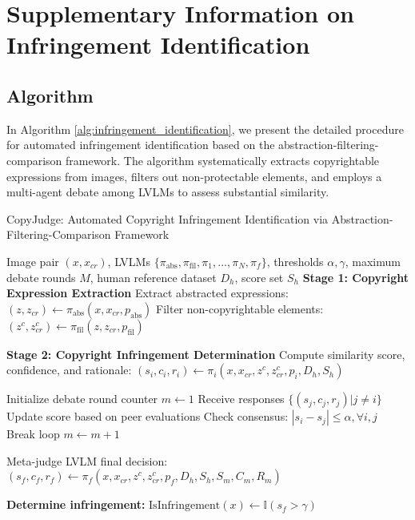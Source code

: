 \section{Supplementary Information on Infringement Identification}

\subsection{Algorithm}
\label{algA}
In Algorithm \ref{alg:infringement_identification}, we present the detailed procedure for automated infringement identification based on the abstraction-filtering-comparison framework. The algorithm systematically extracts copyrightable expressions from images, filters out non-protectable elements, and employs a multi-agent debate among LVLMs to assess substantial similarity.  

\begin{algorithm}
\caption{CopyJudge: Automated Copyright Infringement Identification via Abstraction-Filtering-Comparison Framework}
\label{alg:infringement_identification}
\begin{algorithmic}[1]
\REQUIRE Image pair $(x, x_{cr})$, LVLMs $\{\pi_\text{abs}, \pi_\text{fil}, \pi_1, \dots, \pi_N, \pi_f\}$, thresholds $\alpha, \gamma$, maximum debate rounds $M$, human reference dataset $D_h$, score set $S_h$
\STATE \textbf{Stage 1: Copyright Expression Extraction}
\STATE Extract abstracted expressions: \newline
    \quad $(z, z_{cr}) \leftarrow \pi_\text{abs}(x, x_{cr}, p_\text{abs})$
\STATE Filter non-copyrightable elements: \newline
    \quad $(z^c, z^c_{cr}) \leftarrow \pi_\text{fil}(z, z_{cr}, p_\text{fil})$

\STATE \textbf{Stage 2: Copyright Infringement Determination}
    \STATE Compute similarity score, confidence, and rationale:
    \quad $(s_i, c_i, r_i) \leftarrow \pi_i(x, x_{cr}, z^c, z^c_{cr}, p_i, D_h, S_h)$
\ENDFOR

\STATE Initialize debate round counter $m \gets 1$
        \STATE Receive responses $\{(s_j, c_j, r_j) | j \neq i\}$
        \STATE Update score based on peer evaluations
    \ENDFOR
    \STATE Check consensus: $\left| s_i - s_j \right| \leq \alpha, \forall i, j$
        \STATE Break loop
    \ENDIF
    \STATE $m \gets m + 1$
\ENDWHILE

\STATE Meta-judge LVLM final decision:
\STATE $(s_f, c_f, r_f) \leftarrow \pi_f(x, x_{cr}, z^c, z^c_{cr}, p_f, D_h, S_h, S_m, C_m, R_m)$

\STATE \textbf{Determine infringement:}
\STATE $\text{IsInfringement}(x) \gets \mathbb{I}(s_f > \gamma)$

\end{algorithmic}
\end{algorithm}


